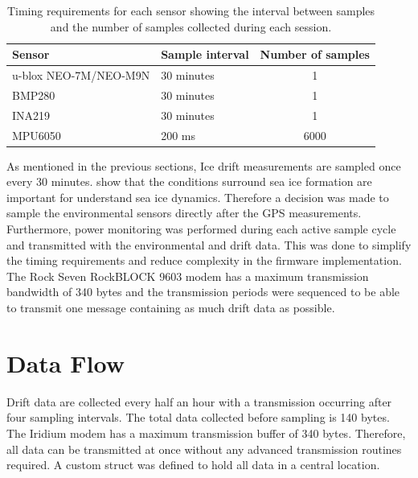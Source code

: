 \begin{table}[H]
	\centering
	\caption{Timing requirements for each sensor showing the interval between samples and the number of samples collected during each session.}
	\label{tab:sensor_timing}
	\setlength{\extrarowheight}{5pt}
	
	\begin{tabular}{llc}
		\hline
		\textbf{Sensor}& \textbf{Sample interval} & \textbf{Number of samples}\\
		\hline
		\hline
		u-blox NEO-7M/NEO-M9N & 30 minutes & 1\\
		\hline
		BMP280 & 30 minutes & 1 \\
		\hline
		INA219 & 30 minutes & 1 \\
		\hline
		MPU6050 & 200 ms & 6000\\
		\hline
		\hline
	\end{tabular}
\end{table}
As mentioned in the previous sections, Ice drift measurements are sampled once every 30 minutes. \textcite{vichi2019effects,alberello2019drift} show that the conditions surround sea ice formation are important for understand sea ice dynamics. Therefore a decision was made to sample the environmental sensors directly after the GPS measurements. Furthermore, power monitoring was performed during each active sample cycle and transmitted with the environmental and drift data. This was done to simplify the timing requirements and reduce complexity in the firmware implementation. The Rock Seven RockBLOCK 9603 modem has a maximum transmission bandwidth of 340 bytes and the transmission periods were sequenced to be able to transmit one message containing as much drift data as possible.

\section{Data Flow}
\label{sec:data_flow}

Drift data are collected every half an hour with a transmission occurring after four sampling intervals. The total data collected before sampling is 140 bytes. The Iridium modem has a maximum transmission buffer of 340 bytes. Therefore, all data can be transmitted at once without any advanced transmission routines required. A custom struct was defined to hold all data in a central location.

